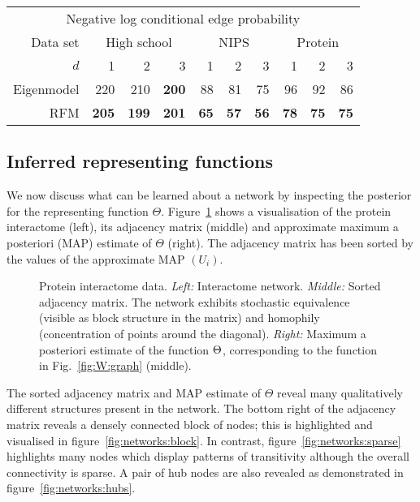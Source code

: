 \begin{center}
  \begin{tabular}{r | r r r | r r r | r r r}
     \multicolumn{10}{c}{Negative log conditional edge probability\footnotemark} \\
     \addlinespace[2pt]
     Data set & \multicolumn{3}{c|}{High school} & \multicolumn{3}{c|}{NIPS} & \multicolumn{3}{c}{Protein} \\
    $d$ & 1 & 2 & 3 & 1 & 2 & 3 & 1 & 2 & 3 \\
    \midrule
    Eigenmodel & 220 & 210 & \textbf{200} & 88 & 81 & 75 & 96 & 92 & 86 \\
    RFM & \textbf{205} & \textbf{199} & \textbf{201} & \textbf{65} & \textbf{57} & \textbf{56} & \textbf{78} & \textbf{75} & \textbf{75}
  \end{tabular}
\end{center}


\subsection{Inferred representing functions}

We now discuss what can be learned about a network by inspecting the posterior for the representing function $\Theta$.
Figure~\ref{fig:(R)GPLVM_Comparison} shows a visualisation of the protein interactome (left), its adjacency matrix (middle) and approximate maximum a posteriori (MAP) estimate of $\Theta$ (right).
The adjacency matrix has been sorted by the values of the approximate MAP $(U_i)$.

\begin{figure}[ht]
  \centering
  
  \vspace{-0.5cm}
  \caption{Protein interactome data. 
    \emph{Left:} Interactome network. 
    \emph{Middle:} Sorted adjacency matrix. The network exhibits stochastic equivalence 
    (visible as block structure in the matrix) and homophily (concentration of points around the diagonal). 
    \emph{Right:} Maximum a posteriori estimate of the function $\Theta$, corresponding to the function in Fig.~\ref{fig:W:graph} (middle).
  }
  \label{fig:(R)GPLVM_Comparison}
\end{figure}

The sorted adjacency matrix and MAP estimate of $\Theta$ reveal many qualitatively different structures present in the network.
The bottom right of the adjacency matrix reveals a densely connected block of nodes; this is highlighted and visualised in figure~\ref{fig:networks:block}.
In contrast, figure~\ref{fig:networks:sparse} highlights many nodes which display patterns of transitivity although the overall connectivity is sparse.
A pair of hub nodes are also revealed as demonstrated in figure~\ref{fig:networks:hubs}.

